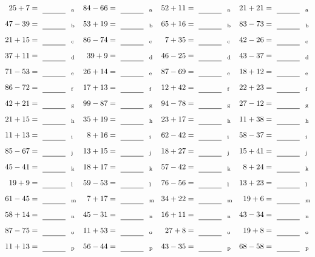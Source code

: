 \documentclass
[
  draft    = true,
  fontsize = 11pt,
  parskip  = half-
]
{scrartcl}
\begin{document}
\clearpage
\begin{align*}
    \pline{25+7}&=\rline{a}
  & \pline{84-66}&=\rline{a}
  & \pline{52+11}&=\rline{a}
  & \pline{21+21}&=\rline{a} \\[1ex]
    \pline{47-39}&=\rline{b}
  & \pline{53+19}&=\rline{b}
  & \pline{65+16}&=\rline{b}
  & \pline{83-73}&=\rline{b} \\[1ex]
    \pline{21+15}&=\rline{c}
  & \pline{86-74}&=\rline{c}
  & \pline{7+35}&=\rline{c}
  & \pline{42-26}&=\rline{c} \\[1ex]
    \pline{37+11}&=\rline{d}
  & \pline{39+9}&=\rline{d}
  & \pline{46-25}&=\rline{d}
  & \pline{43-37}&=\rline{d} \\[1ex]
    \pline{71-53}&=\rline{e}
  & \pline{26+14}&=\rline{e}
  & \pline{87-69}&=\rline{e}
  & \pline{18+12}&=\rline{e} \\[1ex]
    \pline{86-72}&=\rline{f}
  & \pline{17+13}&=\rline{f}
  & \pline{12+42}&=\rline{f}
  & \pline{22+23}&=\rline{f} \\[1ex]
    \pline{42+21}&=\rline{g}
  & \pline{99-87}&=\rline{g}
  & \pline{94-78}&=\rline{g}
  & \pline{27-12}&=\rline{g} \\[1ex]
    \pline{21+15}&=\rline{h}
  & \pline{35+19}&=\rline{h}
  & \pline{23+17}&=\rline{h}
  & \pline{11+38}&=\rline{h} \\[1ex]
    \pline{11+13}&=\rline{i}
  & \pline{8+16}&=\rline{i}
  & \pline{62-42}&=\rline{i}
  & \pline{58-37}&=\rline{i} \\[1ex]
    \pline{85-67}&=\rline{j}
  & \pline{13+15}&=\rline{j}
  & \pline{18+27}&=\rline{j}
  & \pline{15+41}&=\rline{j} \\[1ex]
    \pline{45-41}&=\rline{k}
  & \pline{18+17}&=\rline{k}
  & \pline{57-42}&=\rline{k}
  & \pline{8+24}&=\rline{k} \\[1ex]
    \pline{19+9}&=\rline{l}
  & \pline{59-53}&=\rline{l}
  & \pline{76-56}&=\rline{l}
  & \pline{13+23}&=\rline{l} \\[1ex]
    \pline{61-45}&=\rline{m}
  & \pline{7+17}&=\rline{m}
  & \pline{34+22}&=\rline{m}
  & \pline{19+6}&=\rline{m} \\[1ex]
    \pline{58+14}&=\rline{n}
  & \pline{45-31}&=\rline{n}
  & \pline{16+11}&=\rline{n}
  & \pline{43-34}&=\rline{n} \\[1ex]
    \pline{87-75}&=\rline{o}
  & \pline{11+53}&=\rline{o}
  & \pline{27+8}&=\rline{o}
  & \pline{19+8}&=\rline{o} \\[1ex]
    \pline{11+13}&=\rline{p}
  & \pline{56-44}&=\rline{p}
  & \pline{43-35}&=\rline{p}
  & \pline{68-58}&=\rline{p}
\end{align*}
\end{document}
